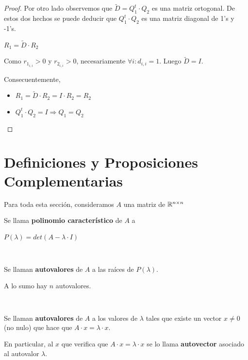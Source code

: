 \documentclass[]{article}
\begin{document}
\begin{prop}
\begin{proof}
		Por otro lado observemos que $\tilde D = Q_1^t\cdot Q_2$ es una matriz ortogonal. De estos dos hechos se puede deducir que $Q_1^t\cdot Q_2$ es una matriz diagonal de 1's y -1's.

		$R_1 = \tilde D \cdot R_2$

		Como $r_{1_{i,i}} > 0$ y $r_{2_{i,i}}>0$, necesariamente $\forall i : d_{i,i}=1$. Luego $\tilde D = I$.

		Consecuentemente,
		\begin{itemize}
			\item $R_1 = \tilde D \cdot R_2 = I \cdot R_2 = R_2$
			\item $Q_1^t\cdot Q_2 = I \Rightarrow Q_1 = Q_2$
		\end{itemize}

	\end{proof}
\end{prop}

\newpage

\section{Definiciones y Proposiciones Complementarias}
Para toda esta sección, consideramos $A$ una matriz de $\mathbb{R}^{n\times n}$

\begin{defi}
	Se llama \textbf{polinomio característico} de $A$ a
	\begin{center}
		$P(\lambda) = det(A-\lambda\cdot I)$
	\end{center}
\end{defi}
~\newline

\begin{defi}
	Se llaman \textbf{autovalores} de $A$ a las raíces de $P(\lambda)$.

	A lo sumo hay $n$ autovalores.
\end{defi}
~\newline

\begin{defi}
	Se llaman \textbf{autovalores} de $A$ a los valores de $\lambda$ tales que existe un vector $x\neq 0$ (no nulo) que hace que $A\cdot x = \lambda \cdot x$.

	En particular, al $x$ que verifica que $A\cdot x = \lambda \cdot x$ se lo llama \textbf{autovector} asociado al autovalor $\lambda$.
\end{defi}
~\newline
\end{document}
